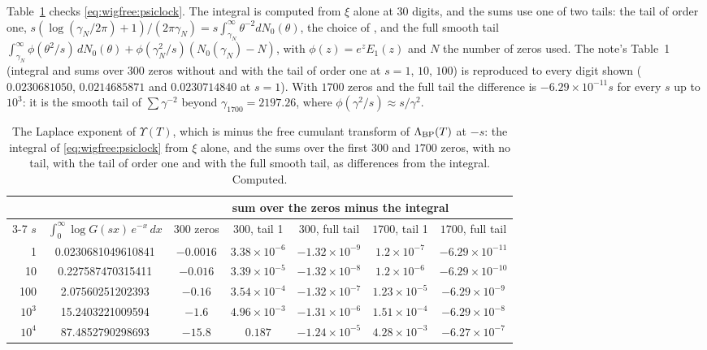 Table~\ref{tab:wigfree:free} checks \eqref{eq:wigfree:psiclock}. The integral is computed from $\xi$ alone at $30$ digits, and the sums use one of two tails: the tail of order one, $s(\log(\gamma_N/2\pi)+1)/(2\pi\gamma_N)=s\int_{\gamma_N}^\infty\theta^{-2}dN_0(\theta)$, the choice of \cite{P26wig}, and the full smooth tail $\int_{\gamma_N}^\infty\phi(\theta^2/s)\,dN_0(\theta)+\phi(\gamma_N^2/s)(N_0(\gamma_N)-N)$, with $\phi(z)=e^zE_1(z)$ and $N$ the number of zeros used. The note's Table~1 (integral and sums over $300$ zeros without and with the tail of order one at $s=1$, $10$, $100$) is reproduced to every digit shown ($0.0230681050$, $0.0214685871$ and $0.0230714840$ at $s=1$). With $1700$ zeros and the full tail the difference is $-6.29\times10^{-11}s$ for every $s$ up to $10^3$: it is the smooth tail of $\sum\gamma^{-2}$ beyond $\gamma_{1700}=2197.26$, where $\phi(\gamma^2/s)\approx s/\gamma^2$.

\begin{table}[htbp]
\centering\footnotesize
\setlength{\tabcolsep}{3pt}
\begin{tabular}{rcccccc}
\toprule
 & & \multicolumn{5}{c}{sum over the zeros minus the integral}\\
\cmidrule(l){3-7}
$s$ & $\int_0^\infty\log G(sx)\,e^{-x}\,dx$ & $300$ zeros & $300$, tail 1 & $300$, full tail & $1700$, tail 1 & $1700$, full tail\\
\midrule
1 & 0.0230681049610841 & $-0.0016$ & $3.38\times10^{-6}$ & $-1.32\times10^{-9}$ & $1.2\times10^{-7}$ & $-6.29\times10^{-11}$\\
10 & 0.227587470315411 & $-0.016$ & $3.39\times10^{-5}$ & $-1.32\times10^{-8}$ & $1.2\times10^{-6}$ & $-6.29\times10^{-10}$\\
100 & 2.07560251202393 & $-0.16$ & $3.54\times10^{-4}$ & $-1.32\times10^{-7}$ & $1.23\times10^{-5}$ & $-6.29\times10^{-9}$\\
$10^3$ & 15.2403221009594 & $-1.6$ & $4.96\times10^{-3}$ & $-1.31\times10^{-6}$ & $1.51\times10^{-4}$ & $-6.29\times10^{-8}$\\
$10^4$ & 87.4852790298693 & $-15.8$ & $0.187$ & $-1.24\times10^{-5}$ & $4.28\times10^{-3}$ & $-6.27\times10^{-7}$\\
\bottomrule
\end{tabular}
\caption{The Laplace exponent of $\Upsilon(T)$, which is minus the free cumulant transform of $\Lambda_{\rm BP}(T)$ at $-s$: the integral of \eqref{eq:wigfree:psiclock} from $\xi$ alone, and the sums over the first $300$ and $1700$ zeros, with no tail, with the tail of order one and with the full smooth tail, as differences from the integral. Computed.}
\label{tab:wigfree:free}
\end{table}

